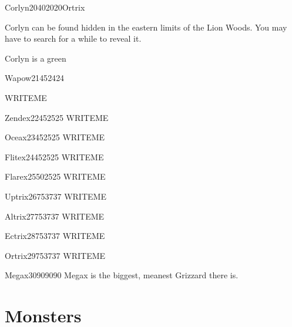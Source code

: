 \documentclass[10pt,twocolumn]{memoir}
\begin{document}
\begin{grizzardpage}{Corlyn}{20}{40}{20}{20}{Ortrix}

  Corlyn can  be found hidden in  the eastern limits of  the Lion Woods.
  You may have to search for a while to reveal it.

  Corlyn is a green 

\end{grizzardpage}

\begin{grizzardpage}{Wapow}{21}{45}{24}{24}{}

  WRITEME

\end{grizzardpage}

\begin{grizzardpage}{Zendex}{22}{45}{25}{25}{}
  WRITEME
\end{grizzardpage}

\begin{grizzardpage}{Oceax}{23}{45}{25}{25}{}
  WRITEME
\end{grizzardpage}

\begin{grizzardpage}{Flitex}{24}{45}{25}{25}{}
  WRITEME
\end{grizzardpage}

\begin{grizzardpage}{Flarex}{25}{50}{25}{25}{}
  WRITEME
\end{grizzardpage}

\begin{grizzardpage}{Uptrix}{26}{75}{37}{37}{}
  WRITEME
\end{grizzardpage}

\begin{grizzardpage}{Altrix}{27}{75}{37}{37}{}
  WRITEME
\end{grizzardpage}

\begin{grizzardpage}{Ectrix}{28}{75}{37}{37}{}
  WRITEME
\end{grizzardpage}

\begin{grizzardpage}{Ortrix}{29}{75}{37}{37}{}
  WRITEME
\end{grizzardpage}

\begin{grizzardpage}{Megax}{30}{90}{90}{90}{}
  Megax is the biggest, meanest Grizzard there is.
\end{grizzardpage}

\chapter{Monsters}\label{ch:Monsters}
\end{document}
